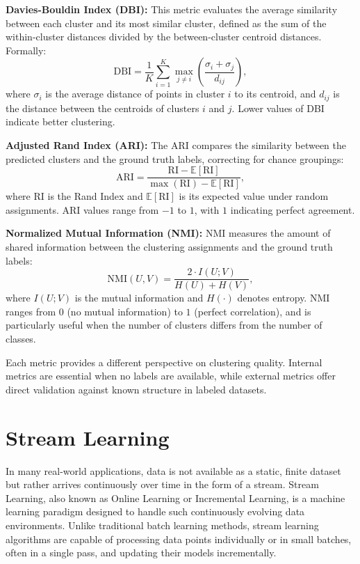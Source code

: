 \textbf{Davies-Bouldin Index (DBI):} This metric evaluates the average similarity between each
cluster and its most similar cluster, defined as the sum of the within-cluster distances divided
by the between-cluster centroid distances. Formally:
\begin{equation}
    \text{DBI} = \frac{1}{K} \sum_{i=1}^{K} \max_{j \ne i} \left( \frac{\sigma_i + \sigma_j}{d_{ij}} \right),
\end{equation}
where $\sigma_i$ is the average distance of points in cluster $i$ to its
centroid, and $d_{ij}$ is the distance between the centroids of clusters $i$
and $j$. Lower values of DBI indicate better clustering.

\textbf{Adjusted Rand Index (ARI):} The ARI compares the similarity between the predicted clusters
and the ground truth labels, correcting for chance groupings:
\begin{equation}
    \text{ARI} = \frac{\text{RI} - \mathbb{E}[\text{RI}]}{\max(\text{RI}) - \mathbb{E}[\text{RI}]},
\end{equation}
where $\text{RI}$ is the Rand Index and $\mathbb{E}[\text{RI}]$ is its expected
value under random assignments. ARI values range from $-1$ to $1$, with $1$
indicating perfect agreement.

\textbf{Normalized Mutual Information (NMI):} NMI measures the amount of shared information
between the clustering assignments and the ground truth labels:
\begin{equation}
    \text{NMI}(U, V) = \frac{2 \cdot I(U; V)}{H(U) + H(V)},
\end{equation}
where $I(U; V)$ is the mutual information and $H(\cdot)$ denotes entropy. NMI
ranges from $0$ (no mutual information) to $1$ (perfect correlation), and is
particularly useful when the number of clusters differs from the number of
classes.

Each metric provides a different perspective on clustering quality. Internal
metrics are essential when no labels are available, while external metrics
offer direct validation against known structure in labeled datasets.

\section{Stream Learning}\label{sec:stream_learning}
In many real-world applications, data is not available as a static, finite
dataset but rather arrives continuously over time in the form of a stream.
Stream Learning, also known as Online Learning or Incremental Learning, is a
machine learning paradigm designed to handle such continuously evolving data
environments. Unlike traditional batch learning methods, stream learning
algorithms are capable of processing data points individually or in small
batches, often in a single pass, and updating their models incrementally.


